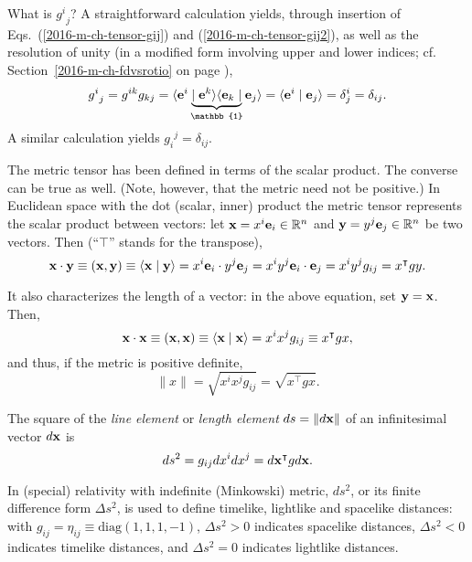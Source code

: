 What is  ${g^i}_{j}$?
A straightforward calculation yields, through insertion of Eqs.~(\ref{2016-m-ch-tensor-gij}) and (\ref{2016-m-ch-tensor-gij2}),
as well as the resolution of unity (in a modified form involving upper and lower indices;
cf. Section~\ref{2016-m-ch-fdvsrotio} on page \pageref{2016-m-ch-fdvsrotio}),
\begin{equation}
{g^i}_{j} = g^{ik}g_{kj}  =
\langle {\bf e}^i \underbrace{\mid {\bf e}^k \rangle \langle {\bf e}_k \mid}_{\mathbb{1}} {\bf e}_j\rangle
= \langle {\bf e}^i \mid {\bf e}_j\rangle
= \delta^i_j = \delta_{ij}.
\label{2014-m-ch-tensor-deltag}
\end{equation}
A similar calculation yields ${g_i}^{j} = \delta_{ij}$.




The metric tensor has been defined in terms of the scalar product.
The converse can be true as well.
(Note, however, that the metric need not be positive.)
In Euclidean space with the dot (scalar, inner) product
the metric tensor represents the scalar product between vectors: let
${\bf x}=x^i{\bf e}_i \in \mathbb{R}^n$ and ${\bf y}=y^j{\bf e}_j \in \mathbb{R}^n$ be two vectors.
Then (``$\intercal$'' stands for the transpose),
\begin{equation}
{\bf x}\cdot {\bf y}\equiv ({\bf x},{\bf y})\equiv \langle {\bf x}\mid {\bf y}\rangle
= x^i {\bf e}_i\cdot y^j {\bf e}_j
= x^iy^j {\bf e}_i\cdot  {\bf e}_j
=x^iy^j g_{ij}= x^\intercal  g y.
\end{equation}

It also characterizes the length of a vector: in the above
equation, set ${\bf y}={\bf x}$. Then,
\begin{equation}
{\bf x}\cdot {\bf x}\equiv ({\bf x},{\bf x})\equiv \langle {\bf x}\mid {\bf x}\rangle
=x^ix^j g_{ij}\equiv x^\intercal  g x,
\end{equation}
and thus, if the metric is positive definite,
\begin{equation}
\|  x\|  =\sqrt{x^ix^j g_{ij}}= \sqrt{x^\intercal  g x}.
\end{equation}



The square of the {\em line element} or {\em length element}
$ds =\| d{\bf x} \| $ of an infinitesimal vector $d{\bf x} $ is
\begin{equation}
d s^2  = g_{ij}dx^i dx^j= d{\bf x}^\intercal  g d{\bf x}.
\end{equation}

In (special) relativity with indefinite (Minkowski) metric, $ds^2$, or its finite difference form $\Delta s^2$, is used to define timelike, lightlike and spacelike distances:
with $g_{ij}=\eta_{ij}\equiv \text{diag}(1,1,1,-1)$,
$\Delta s^2 >0$ indicates spacelike distances,
$\Delta s^2 <0$ indicates timelike distances,
and $\Delta s^2 =0$ indicates lightlike distances.





